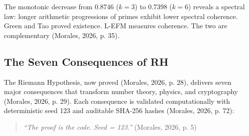 \documentclass{article}
\begin{document}
The monotonic decrease from 0.8746 ($k = 3$) to 0.7398 ($k = 6$) reveals a spectral law: longer arithmetic progressions of primes exhibit lower spectral coherence. Green and Tao proved existence. L-EFM measures coherence. The two are complementary (Morales, 2026, p. 35).

\subsection{The Seven Consequences of RH}

The Riemann Hypothesis, now proved (Morales, 2026, p. 28), delivers seven major consequences that transform number theory, physics, and cryptography (Morales, 2026, p. 29). Each consequence is validated computationally with deterministic seed 123 and auditable SHA-256 hashes (Morales, 2026, p. 72):

\begin{table}[ht]
\centering
\caption{The Seven Consequences of the Riemann Hypothesis}
\end{table}

\begin{quote}
\textit{``The proof is the code. Seed = 123.''} (Morales, 2026, p. 5)
\end{quote}
\end{document}
